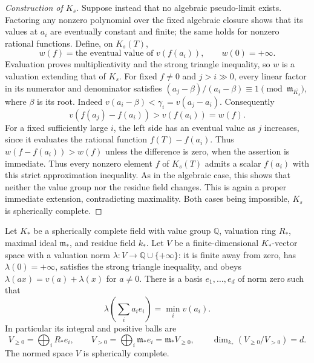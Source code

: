 \begin{proof}[Construction of $K_s$]
Suppose instead that no algebraic pseudo-limit exists.  Factoring any
nonzero polynomial over the fixed algebraic closure shows that its
values at $a_i$ are eventually constant and finite; the same holds for
nonzero rational functions.  Define, on $K_s(T)$,
\[
                 w(f)=\text{the eventual value of }v(f(a_i)),
                 \qquad w(0)=+\infty.
\]
Evaluation proves multiplicativity and the strong triangle inequality,
so $w$ is a valuation extending that of $K_s$.
For fixed $f\ne0$ and $j>i\gg0$, every linear factor in its numerator
and denominator satisfies
$(a_j-\beta)/(a_i-\beta)\equiv1\pmod{\mathfrak m_{\overline{K_s}}}$,
where $\beta$ is its root. Indeed $v(a_i-\beta)<\gamma_i=v(a_j-a_i)$.
Consequently
\[
                    v(f(a_j)-f(a_i))>v(f(a_i))=w(f).
\]
For a fixed sufficiently large $i$, the left side has an eventual
value as $j$ increases, since it evaluates the rational function
$f(T)-f(a_i)$.  Thus
$w(f-f(a_i))>w(f)$ unless the difference is zero, when the assertion
is immediate. Thus every nonzero element $f$ of $K_s(T)$ admits a
scalar $f(a_i)$ with this strict approximation inequality. As in the
algebraic case, this shows that neither the value group nor the residue
field changes. This is again a proper immediate extension,
contradicting maximality.  Both cases being impossible, $K_s$ is
spherically complete.
\end{proof}

\begin{lemma}\label{lem:orthogonal-bases}
Let $K_*$ be a spherically complete field with value group $\mathbb Q$,
valuation ring $R_*$, maximal ideal $\mathfrak m_*$, and residue field
$k_*$.  Let $V$ be a finite-dimensional $K_*$-vector space with a
valuation norm $\lambda:V\to\mathbb Q\cup\{+\infty\}$: it is finite
away from zero, has $\lambda(0)=+\infty$, satisfies the strong triangle inequality, and obeys
$\lambda(ax)=v(a)+\lambda(x)$ for $a\ne0$.
There is a basis $e_1,\ldots,e_d$ of norm zero such that
\begin{equation}\label{eq:orthogonal-basis}
             \lambda\left(\sum_i a_i e_i\right)=\min_i v(a_i).
\end{equation}
In particular its integral and positive balls are
\begin{equation}\label{eq:orthogonal-lattice}
 V_{\geq0}=\bigoplus_i R_*e_i,\qquad
 V_{>0}=\bigoplus_i\mathfrak m_*e_i
             =\mathfrak m_*V_{\geq0},
 \qquad \dim_{k_*}(V_{\geq0}/V_{>0})=d.
\end{equation}
The normed space $V$ is spherically complete.
\end{lemma}

